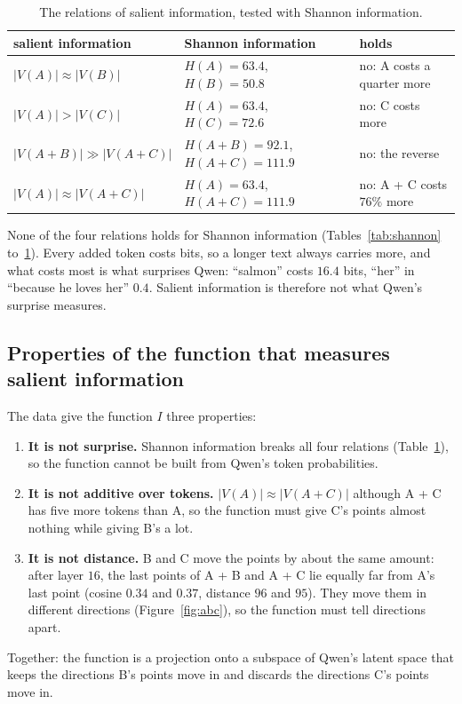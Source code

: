 \documentclass[11pt]{article}
\theoremstyle{remark}
\begin{document}
\begin{table}[ht]
\centering
\setlength{\tabcolsep}{4pt}
\begin{tabular}{@{}lll@{}}
salient information & Shannon information & holds \\
\hline
$|V(A)| \approx |V(B)|$ & $H(A) = 63.4$, $H(B) = 50.8$ & no: A costs a quarter more \\
$|V(A)| > |V(C)|$ & $H(A) = 63.4$, $H(C) = 72.6$ & no: C costs more \\
$|V(A + B)| \gg |V(A + C)|$ & $H(A + B) = 92.1$, $H(A + C) = 111.9$ & no: the reverse \\
$|V(A)| \approx |V(A + C)|$ & $H(A) = 63.4$, $H(A + C) = 111.9$ & no: A + C costs $76\%$ more \\
\end{tabular}
\caption{The relations of salient information, tested with Shannon information.}
\label{tab:relations}
\end{table}

None of the four relations holds for Shannon information (Tables~\ref{tab:shannon} to~\ref{tab:relations}). Every added token costs bits, so a longer text always carries more, and what costs most is what surprises Qwen: ``salmon'' costs $16.4$ bits, ``her'' in ``because he loves her'' $0.4$. Salient information is therefore not what Qwen's surprise measures.

\subsection{Properties of the function that measures salient information}\label{sec:properties}

The data give the function $I$ three properties:
\begin{enumerate}
  \item \textbf{It is not surprise.} Shannon information breaks all four relations (Table~\ref{tab:relations}), so the function cannot be built from Qwen's token probabilities.
  \item \textbf{It is not additive over tokens.} $|V(A)| \approx |V(A + C)|$ although A + C has five more tokens than A, so the function must give C's points almost nothing while giving B's a lot.
  \item \textbf{It is not distance.} B and C move the points by about the same amount: after layer $16$, the last points of A + B and A + C lie equally far from A's last point (cosine $0.34$ and $0.37$, distance $96$ and $95$). They move them in different directions (Figure~\ref{fig:abc}), so the function must tell directions apart.
\end{enumerate}
Together: the function is a projection onto a subspace of Qwen's latent space that keeps the directions B's points move in and discards the directions C's points move in.
\end{document}
